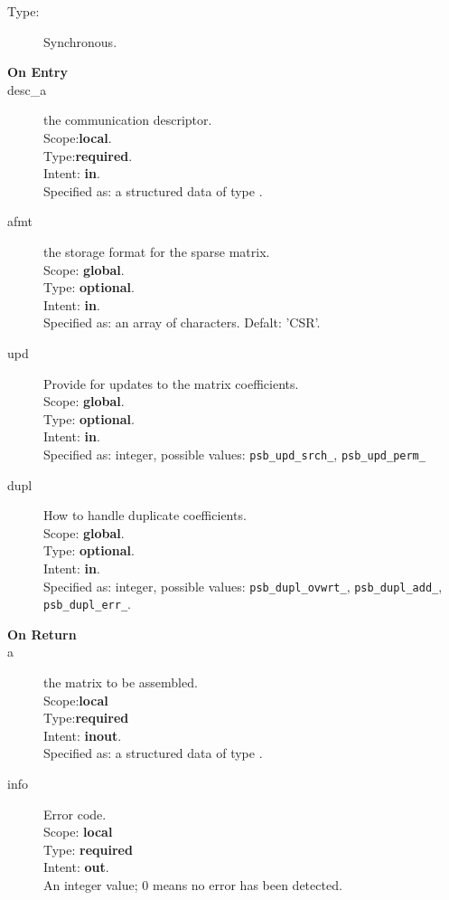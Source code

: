 %
%


\begin{description}
\item[Type:] Synchronous.
\item[\bf On Entry]
\item[desc\_a] the communication descriptor.\\
Scope:{\bf local}.\\
Type:{\bf required}.\\
Intent: {\bf in}.\\
Specified as: a structured data of type \descdata.
\item[afmt] the storage format for the sparse matrix.\\
Scope: {\bf global}.\\
Type: {\bf optional}.\\
Intent: {\bf in}.\\
Specified as: an array of characters. Defalt:  'CSR'.
\item[upd] Provide for updates to the matrix coefficients.\\
Scope: {\bf global}.\\
Type: {\bf optional}.\\
Intent: {\bf in}.\\
Specified as: integer, possible values: \verb|psb_upd_srch_|, \verb|psb_upd_perm_|
\item[dupl] How to handle duplicate coefficients.\\
Scope: {\bf global}.\\
Type: {\bf optional}.\\
Intent: {\bf in}.\\
Specified as: integer, possible values: \verb|psb_dupl_ovwrt_|,
\verb|psb_dupl_add_|, \verb|psb_dupl_err_|.
\end{description}

\begin{description}
\item[\bf On Return]
\item[a] the matrix to be assembled.\\
Scope:{\bf local}\\
Type:{\bf required}\\
Intent: {\bf inout}.\\
Specified as: a structured data of type \spdata.
\item[info] Error code.\\
Scope: {\bf local} \\
Type: {\bf required} \\
Intent: {\bf out}.\\
An integer value; 0 means no error has been detected. 
\end{description}

